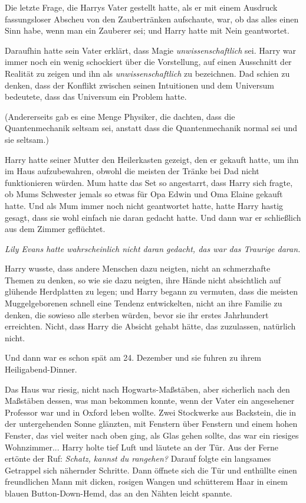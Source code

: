 Die letzte Frage, die Harrys Vater gestellt hatte, als er mit einem Ausdruck
fassungsloser Abscheu von den Zaubertränken aufschaute, war, ob das alles einen
Sinn habe, wenn man ein Zauberer sei; und Harry hatte mit Nein geantwortet.

Daraufhin hatte sein Vater erklärt, dass Magie \emph{unwissenschaftlich} sei.
Harry war immer noch ein wenig schockiert über die Vorstellung, auf einen
Ausschnitt der Realität zu zeigen und ihn als \emph{unwissenschaftlich} zu
bezeichnen. Dad schien zu denken, dass der Konflikt zwischen seinen Intuitionen
und dem Universum bedeutete, dass das Universum ein Problem hatte.

(Andererseits gab es eine Menge Physiker, die dachten, dass die Quantenmechanik
seltsam sei, anstatt dass die Quantenmechanik normal sei und sie seltsam.)

Harry hatte seiner Mutter den Heilerkasten gezeigt, den er gekauft hatte, um ihn
im Haus aufzubewahren, obwohl die meisten der Tränke bei Dad nicht funktionieren
würden. Mum hatte das Set so angestarrt, dass Harry sich fragte, ob Mums
Schwester jemals so etwas für Opa Edwin und Oma Elaine gekauft hatte. Und als
Mum immer noch nicht geantwortet hatte, hatte Harry hastig gesagt, dass sie wohl
einfach nie daran gedacht hatte. Und dann war er schließlich aus dem Zimmer
geflüchtet.

\emph{Lily Evans hatte wahrscheinlich nicht daran gedacht, das war das Traurige daran.}

Harry wusste, dass andere Menschen dazu neigten, nicht an schmerzhafte Themen zu
denken, so wie sie dazu neigten, ihre Hände nicht absichtlich auf glühende
Herdplatten zu legen; und Harry begann zu vermuten, dass die meisten
Muggelgeborenen schnell eine Tendenz entwickelten, nicht an ihre Familie zu
denken, die sowieso alle sterben würden, bevor sie ihr erstes Jahrhundert
erreichten. Nicht, dass Harry die Absicht gehabt hätte, das zuzulassen,
natürlich nicht.

Und dann war es schon spät am 24. Dezember und sie fuhren zu ihrem
Heiligabend-Dinner.

Das Haus war riesig, nicht nach Hogwarts-Maßstäben, aber sicherlich nach den
Maßstäben dessen, was man bekommen konnte, wenn der Vater ein angesehener
Professor war und in Oxford leben wollte. Zwei Stockwerke aus Backstein, die in
der untergehenden Sonne glänzten, mit Fenstern über Fenstern und einem hohen
Fenster, das viel weiter nach oben ging, als Glas gehen sollte, das war ein
riesiges Wohnzimmer... Harry holte tief Luft und läutete an der Tür. Aus der
Ferne ertönte der Ruf: \glqq \emph{Schatz, kannst du rangehen?}\grqq{} Darauf
folgte ein langsames Getrappel sich nähernder Schritte. Dann öffnete sich die
Tür und enthüllte einen freundlichen Mann mit dicken, rosigen Wangen und
schütterem Haar in einem blauen Button-Down-Hemd, das an den Nähten leicht
spannte.


